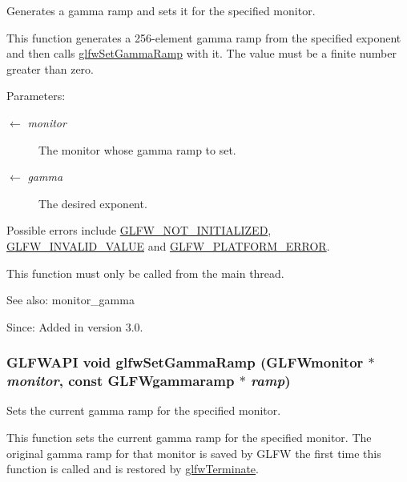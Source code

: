 Generates a gamma ramp and sets it for the specified monitor. 

This function generates a 256-element gamma ramp from the specified exponent and then calls \hyperlink{group__monitor_gc9f36a1cfa10eab191d3029ea8bc9558}{glfwSetGammaRamp} with it. The value must be a finite number greater than zero.

\begin{Desc}
\item[Parameters:]
\begin{description}
\item[\mbox{$\leftarrow$} {\em monitor}]The monitor whose gamma ramp to set. \item[\mbox{$\leftarrow$} {\em gamma}]The desired exponent.\end{description}
\end{Desc}
Possible errors include \hyperlink{group__errors_g2374ee02c177f12e1fa76ff3ed15e14a}{GLFW\_\-NOT\_\-INITIALIZED}, \hyperlink{group__errors_gaf2ef9aa8202c2b82ac2d921e554c687}{GLFW\_\-INVALID\_\-VALUE} and \hyperlink{group__errors_gd44162d78100ea5e87cdd38426b8c7a1}{GLFW\_\-PLATFORM\_\-ERROR}.

This function must only be called from the main thread.

\begin{Desc}
\item[See also:]monitor\_\-gamma\end{Desc}
\begin{Desc}
\item[Since:]Added in version 3.0. \end{Desc}
\hypertarget{group__monitor_gc9f36a1cfa10eab191d3029ea8bc9558}{
\subsubsection[glfwSetGammaRamp]{\setlength{\rightskip}{0pt plus 5cm}GLFWAPI void glfwSetGammaRamp ({\bf GLFWmonitor} $\ast$ {\em monitor}, \/  const {\bf GLFWgammaramp} $\ast$ {\em ramp})}}
\label{group__monitor_gc9f36a1cfa10eab191d3029ea8bc9558}


Sets the current gamma ramp for the specified monitor. 

This function sets the current gamma ramp for the specified monitor. The original gamma ramp for that monitor is saved by GLFW the first time this function is called and is restored by \hyperlink{group__init_gfd90e6fd4819ea9e22e5e739519a6504}{glfwTerminate}.

